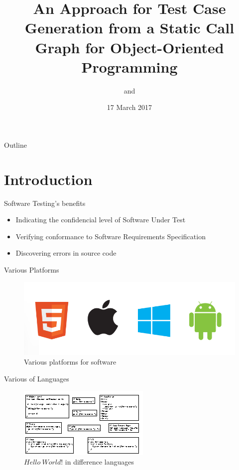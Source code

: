 \documentclass{beamer}
\title{An Approach for Test Case Generation from a Static Call Graph for Object-Oriented Programming}
\date{17 March 2017}
\author{\authorNameEN~\small{and~\advisorEn}}
\institute{{\facultyEn}, {\universityEn}}
\begin{document}
\maketitle

\begin{frame}[t]{Outline}
    \tableofcontents[hideallsubsections]
\end{frame}

\newcommand{\displayframe}{%
    \begin{frame}{Outline}
    \tableofcontents[%
        currentsection,
        subsectionstyle=hide
        ]
    \end{frame}
}
%
\section{Introduction}
\begin{frame}{Software Testing's benefits}
  \begin{itemize}
     \item Indicating the confidencial level of Software Under Test
     \item Verifying conformance to Software Requirements Specification
     \item Discovering errors in source code
  \end{itemize}
\end{frame}

\begin{frame}{Various Platforms}
    \begin{figure}
        \includegraphics[width=.8\paperwidth]{figure/mobile_bugs}
        \caption{Various platforms for software}
        \label{fig:variousplatform}
    \end{figure}
\end{frame}

\begin{frame}{Various of Languages}
    \begin{figure}
        \includegraphics[width=.9\paperwidth]{figure/hello-world-lang}
        \caption{$Hello~World!$ in difference languages}
        \label{fig:helloworld}
    \end{figure}
\end{frame}
\end{document}
